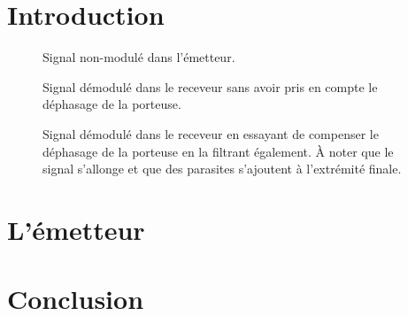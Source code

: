 \documentclass[10pt, oneside, a4paper]{article}
\begin{document}
\tableofcontents
\newpage

\section{Introduction}

\begin{figure}[htbp]
	\centering
	\caption{Signal non-modulé dans l'émetteur.}
\end{figure}
\begin{figure}[htbp]
	\centering
	\caption{Signal démodulé dans le receveur sans avoir pris en compte
			le déphasage de la porteuse.}
\end{figure}
\begin{figure}[htbp]
	\centering
	\caption{Signal démodulé dans le receveur en essayant de compenser le
			déphasage de la porteuse en la filtrant également.
			À noter que le signal s'allonge et que des parasites s'ajoutent
			à l'extrémité finale.}
\end{figure}

\section{L'émetteur}

\section{Conclusion}
\end{document}
